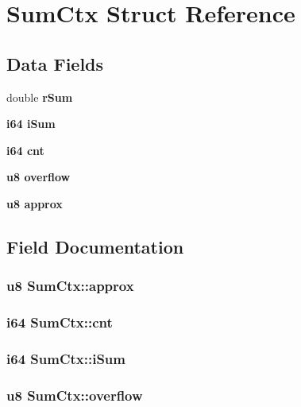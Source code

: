 \section{Sum\-Ctx Struct Reference}
\label{structSumCtx}
\subsection*{Data Fields}
\begin{CompactItemize}
\item 
double \bf{r\-Sum}
\item 
\bf{i64} \bf{i\-Sum}
\item 
\bf{i64} \bf{cnt}
\item 
\bf{u8} \bf{overflow}
\item 
\bf{u8} \bf{approx}
\end{CompactItemize}


\subsection{Field Documentation}
\subsubsection{\setlength{\rightskip}{0pt plus 5cm}\bf{u8} \bf{Sum\-Ctx::approx}}\label{structSumCtx_c9ab1c817c6ff556301c3545f1c33fcd}


\subsubsection{\setlength{\rightskip}{0pt plus 5cm}\bf{i64} \bf{Sum\-Ctx::cnt}}\label{structSumCtx_fdf0113bfe331eceb1afcd785a1b9ed2}


\subsubsection{\setlength{\rightskip}{0pt plus 5cm}\bf{i64} \bf{Sum\-Ctx::i\-Sum}}\label{structSumCtx_0aadeedcbef52ac62c45eecfa2bb9b85}


\subsubsection{\setlength{\rightskip}{0pt plus 5cm}\bf{u8} \bf{Sum\-Ctx::overflow}}\label{structSumCtx_41facc6e0441860244b4120feac7f30c}


